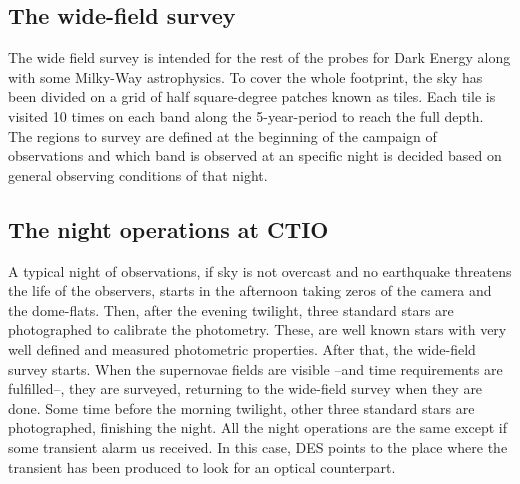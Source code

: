 \subsection{The wide-field survey}
The wide field survey is intended for the rest of the probes for Dark Energy along with some Milky-Way astrophysics. To cover the whole footprint, the sky has been divided on a grid of half square-degree patches known as tiles. Each tile is visited 10 times on each band along the 5-year-period to reach the full depth. The regions to survey are defined at the beginning of the campaign of observations and which band is observed at an specific night is decided based on general observing conditions of that night.

\subsection{The night operations at CTIO}
A typical night of observations, if sky is not overcast and no earthquake threatens the life of the observers, starts in the afternoon taking zeros of the camera and the dome-flats. Then, after the evening twilight, three standard stars are photographed to calibrate the photometry. These, are well known stars with very well defined and measured photometric properties. After that, the wide-field survey starts. When the supernovae fields are visible --and time requirements are fulfilled--, they are surveyed, returning to the wide-field survey when they are done. Some time before the morning twilight, other three standard stars are photographed, finishing the night. All the night operations are the same except if some transient alarm us received. In this case,  DES points to the place where the transient has been produced to look for an optical counterpart.

